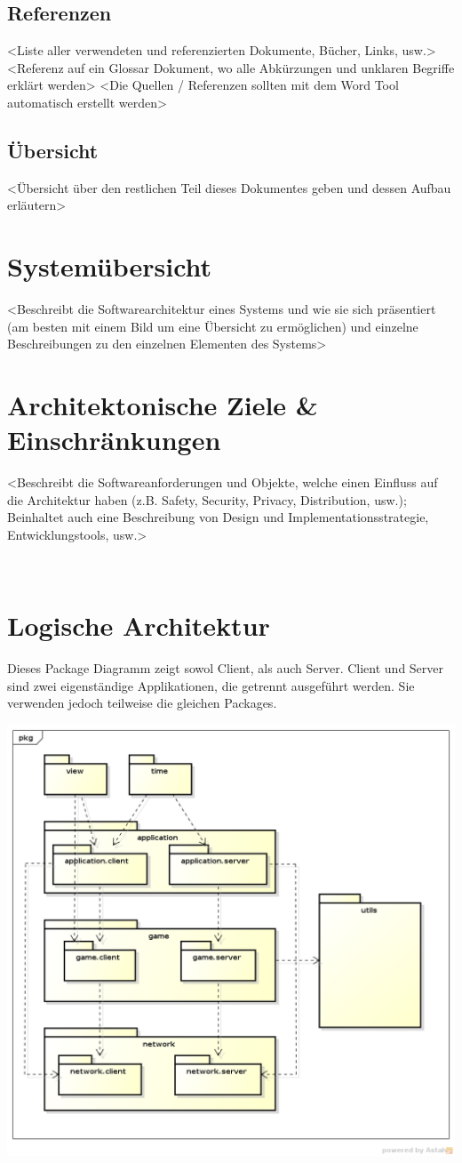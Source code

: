 \documentclass[11pt]{scrartcl}
\begin{document}
\subsection{Referenzen}
<Liste aller verwendeten und referenzierten Dokumente, Bücher, Links, usw.>
<Referenz auf ein Glossar Dokument, wo alle Abkürzungen und unklaren Begriffe erklärt werden>
<Die Quellen / Referenzen sollten mit dem Word Tool automatisch erstellt werden>
\subsection{Übersicht}
<Übersicht über den restlichen Teil dieses Dokumentes geben und dessen Aufbau erläutern>
 
\section{Systemübersicht}
<Beschreibt die Softwarearchitektur eines Systems und wie sie sich präsentiert (am besten mit einem Bild um eine Übersicht zu ermöglichen) und einzelne Beschreibungen zu den einzelnen Elementen des Systems>
 
\section{Architektonische Ziele \& Einschränkungen}
<Beschreibt die Softwareanforderungen und Objekte, welche einen Einfluss auf die Architektur haben (z.B. Safety, Security, Privacy, Distribution, usw.); Beinhaltet auch eine Beschreibung von Design und Implementationsstrategie, Entwicklungstools, usw.>

\newpage
 
\section{Logische Architektur}
Dieses Package Diagramm zeigt sowol Client, als auch Server. Client und Server sind zwei eigenständige Applikationen, die getrennt ausgeführt werden. Sie verwenden jedoch teilweise die gleichen Packages.

\includegraphics[scale=0.5]{LogischeSicht}
\end{document}
